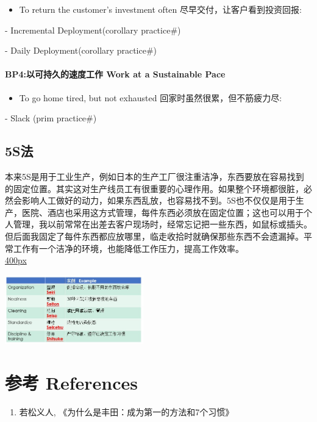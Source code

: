 \begin{itemize}
\tightlist
\item
  To return the customer's investment often
  尽早交付，让客户看到投资回报:
\end{itemize}

\begin{description}
\tightlist
\item[]
- Incremental Deployment(corollary practice\#)

- Daily Deployment(corollary practice\#)
\end{description}

\hypertarget{bp4ux4ee5ux53efux6301ux4e45ux7684ux901fux5ea6ux5de5ux4f5c-work-at-a-sustainable-pace}{%
\paragraph{BP4:以可持久的速度工作 Work at a Sustainable
Pace}\label{bp4ux4ee5ux53efux6301ux4e45ux7684ux901fux5ea6ux5de5ux4f5c-work-at-a-sustainable-pace}}

\begin{itemize}
\tightlist
\item
  To go home tired, but not exhausted 回家时虽然很累，但不筋疲力尽:\\
\end{itemize}

\begin{description}
\tightlist
\item[]
- Slack (prim practice\#)
\end{description}

\hypertarget{sux6cd5}{%
\subsection{5S法}\label{sux6cd5}}

本来5S是用于工业生产，例如日本的生产工厂很注重洁净，东西要放在容易找到的固定位置。其实这对生产线员工有很重要的心理作用。如果整个环境都很脏，必然会影响人工做好的动力，如果东西乱放，也容易找不到。5S也不仅仅是用于生产，医院、酒店也采用这方式管理，每件东西必须放在固定位置；这也可以用于个人管理，我以前常常在出差去客户现场时，经常忘记把一些东西，如鼠标或插头。但后面我固定了每件东西都应放哪里，临走收拾时就确保那些东西不会遗漏掉。平常工作有一个洁净的环境，也能降低工作压力，提高工作效率。\\

\href{文件:5S_五常法_Screenshot_2023-08-03_211606.jpg}{400px}

\includegraphics[width=6cm]{5S_五常法_Screenshot_2023-08-03_211606.jpg}\\

\hypertarget{ux53c2ux8003-references}{%
\section{参考 References}\label{ux53c2ux8003-references}}

\begin{enumerate}
\tightlist
\item
  若松义人, 《为什么是丰田：成为第一的方法和7个习惯》
\end{enumerate}


